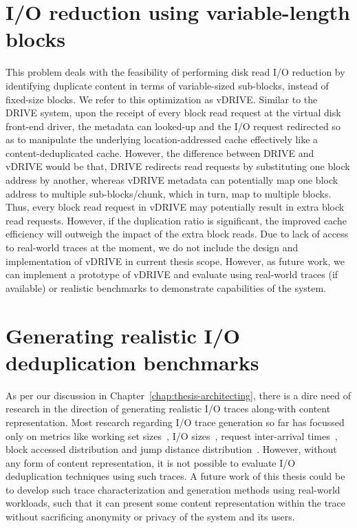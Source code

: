 \section{I/O reduction using variable-length blocks}
This problem deals with the feasibility of performing disk
read I/O reduction by identifying duplicate content in terms of
variable-sized sub-blocks, instead of fixed-size blocks.
We refer to this optimization as vDRIVE.
Similar to the DRIVE system, upon the receipt 
of every block read request at the virtual disk front-end driver, 
the metadata can looked-up and the I/O
request redirected so as to manipulate the underlying 
location-addressed cache effectively like a content-deduplicated cache. 
However, the difference between DRIVE and vDRIVE would be that, DRIVE
redirects read requests by substituting one block address by 
another, whereas vDRIVE metadata can potentially map one block
address to multiple sub-blocks/chunk, which in turn, map to multiple blocks.
Thus, every block read request in vDRIVE may potentially result
in extra block read requests. However, if the duplication ratio
is significant, the improved cache efficiency will outweigh the
impact of the extra block reads.
Due to lack of access to real-world traces at the moment, we
do not include the design and implementation of vDRIVE in current
thesis scope.
However, as future work, we can implement a prototype of vDRIVE
and evaluate using real-world traces (if available) or
realistic benchmarks to demonstrate capabilities of the system.

\section{Generating realistic I/O deduplication benchmarks}
As per our discussion in Chapter~\ref{chap:thesis-architecting}, there
is a dire need of research in the direction of generating
realistic I/O traces along-with content representation. Most research
regarding I/O trace generation so far has focussed only on metrics
like working set sizes~\cite{working-set}, 
I/O sizes~\cite{flexi-replay}, 
request inter-arrival times~\cite{storagereplay},
block accessed distribution and
jump distance distribution~\cite{jump-based-synthetic}. However, 
without any form of content representation, it is not possible
to evaluate I/O deduplication techniques using such traces. 
A future work of this thesis could be to develop such trace 
characterization and generation methods using real-world
workloads, such that it can present some
content representation within the trace without sacrificing 
anonymity or privacy of the system and its users.

